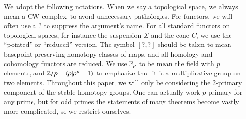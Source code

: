 We adopt the following notations.
When we say a topological space, we always mean a CW-complex, to avoid unnecessary pathologies.  
For functors, we will often use a $?$ to suppress the argument's name.
For all standard functors on topological spaces, for instance the suspension $\Sigma$ and the cone $C$, we use the ``pointed'' or ``reduced'' version.
The symbol $[?,?]$ should be taken to mean basepoint-preserving homotopy classes of maps, and all homology and cohomology functors are reduced.  
We use $\mathbb{F}_p$ to be mean the field with $p$ elements, and $\mathbb{Z}/p=\langle \rho | \rho^p=1\rangle$ to emphasize that it is a multiplicative group on two elements.  
Throughout this paper, we will only be considering the 2-primary component of the stable homotopy groups.  
One can actually work $p$-primary for any prime, but for odd primes the statements of many theorems become vastly more complicated, so we restrict ourselves.  





